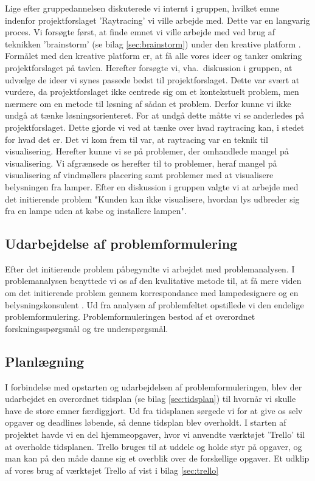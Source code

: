 \documentclass[oneside,a4paper,titlepage]{article}
\begin{document}
Lige efter gruppedannelsen diskuterede vi internt i gruppen, hvilket emne indenfor projektforslaget 'Raytracing' vi ville arbejde med. Dette var en langvarig proces. Vi forsøgte først, at finde emnet vi ville arbejde med ved brug af teknikken 'brainstorm' (se bilag \ref{sec:brainstorm}) under den kreative platform \cite{kreativ_platform}. Formålet med den kreative platform er, at få alle vores ideer og tanker omkring projektforslaget på tavlen. Herefter forsøgte vi, vha.\ diskussion i gruppen, at udvælge de ideer vi synes passede bedst til projektforslaget. Dette var svært at vurdere, da projektforslaget ikke centrede sig om et kontekstuelt problem, men nærmere om en metode til løsning af sådan et problem. Derfor kunne vi ikke undgå at tænke løsningsorienteret. For at undgå dette måtte vi se anderledes på projektforslaget. Dette gjorde vi ved at tænke over hvad raytracing kan, i stedet for hvad det er. Det vi kom frem til var, at raytracing var en teknik til visualisering. Herefter kunne vi se på problemer, der omhandlede mangel på visualisering. Vi afgrænsede os herefter til to problemer, heraf mangel på visualisering af vindmøllers placering samt problemer med at visualisere belysningen fra lamper. Efter en diskussion i gruppen valgte vi at arbejde med det initierende problem "Kunden kan ikke visualisere, hvordan lys udbreder sig fra en lampe uden at købe og installere lampen". 

\subsection{Udarbejdelse af problemformulering}
Efter det initierende problem påbegyndte vi arbejdet med problemanalysen. I problemanalysen benyttede vi os af den kvalitative metode til, at få mere viden om det initierende problem gennem korrespondance med lampedesignere og en belysningskonsulent \cite{kvalitativ_metode}. Ud fra analysen af problemfeltet opstillede vi den endelige problemformulering. Problemformuleringen bestod af et overordnet forskningsspørgsmål og tre underspørgsmål.

\subsection{Planlægning}
I forbindelse med opstarten og udarbejdelsen af problemformuleringen, blev der udarbejdet en overordnet tidsplan (se bilag \ref{sec:tidsplan}) til hvornår vi skulle have de store emner færdiggjort. Ud fra tidsplanen sørgede vi for at give os selv opgaver og deadlines løbende, så denne tidsplan blev overholdt. I starten af projektet havde vi en del hjemmeopgaver, hvor vi anvendte værktøjet 'Trello' til at overholde tidsplanen. Trello bruges til at uddele og holde styr på opgaver, og man kan på den måde danne sig et overblik over de forskellige opgaver. Et udklip af vores brug af værktøjet Trello af vist i bilag \ref{sec:trello}
\newline
\end{document}
